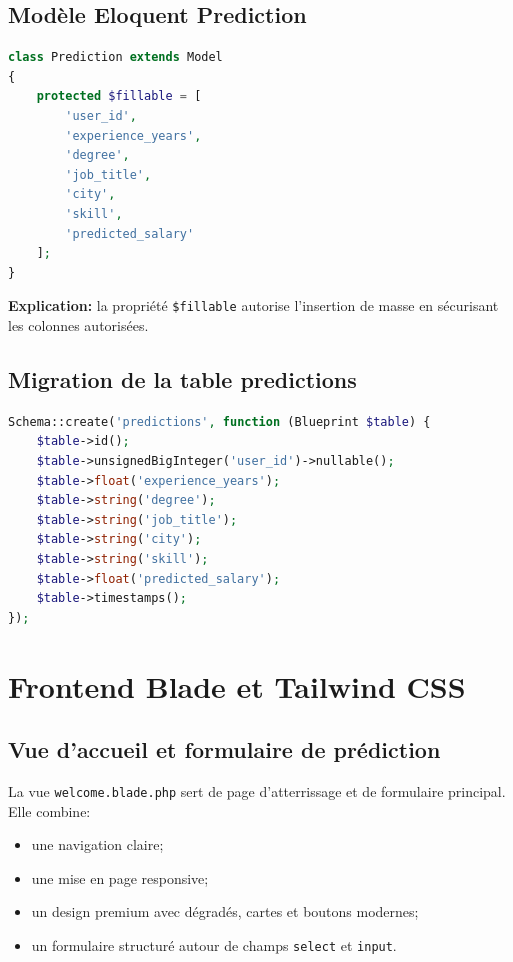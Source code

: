 \documentclass[11pt,a4paper]{article}
\begin{document}
\subsection{Mod\`ele Eloquent Prediction}
\begin{lstlisting}[language=PHP, caption={Modele Prediction}]
class Prediction extends Model
{
    protected $fillable = [
        'user_id',
        'experience_years',
        'degree',
        'job_title',
        'city',
        'skill',
        'predicted_salary'
    ];
}
\end{lstlisting}

\textbf{Explication:} la propri\'et\'e \texttt{\$fillable} autorise l'insertion de masse en s\'ecurisant les colonnes autoris\'ees.

\subsection{Migration de la table predictions}
\begin{lstlisting}[language=PHP, caption={Migration importante pour le stockage des pr\'edictions}]
Schema::create('predictions', function (Blueprint $table) {
    $table->id();
    $table->unsignedBigInteger('user_id')->nullable();
    $table->float('experience_years');
    $table->string('degree');
    $table->string('job_title');
    $table->string('city');
    $table->string('skill');
    $table->float('predicted_salary');
    $table->timestamps();
});
\end{lstlisting}

\section{Frontend Blade et Tailwind CSS}

\subsection{Vue d'accueil et formulaire de pr\'ediction}
La vue \texttt{welcome.blade.php} sert de page d'atterrissage et de formulaire principal. Elle combine:
\begin{itemize}[leftmargin=1.2cm]
    \item une navigation claire;
    \item une mise en page responsive;
    \item un design premium avec d\'egrad\'es, cartes et boutons modernes;
    \item un formulaire structur\'e autour de champs \texttt{select} et \texttt{input}.
\end{itemize}
\end{document}

